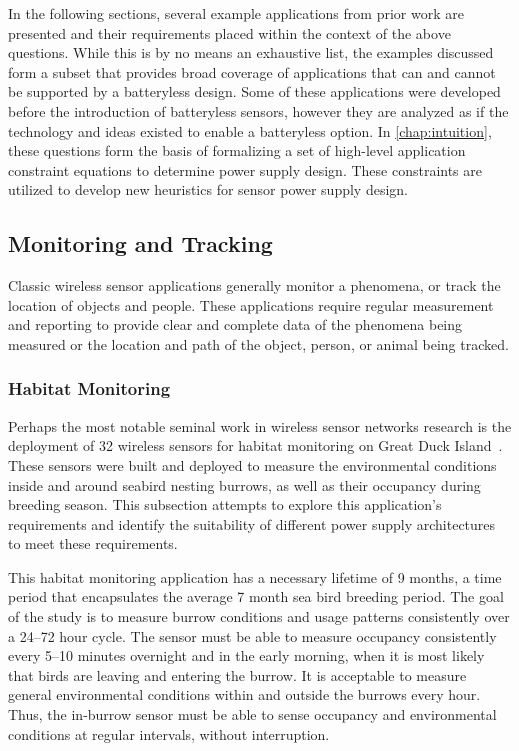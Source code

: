\noindent In the following sections, several example applications from prior work are presented and their requirements placed within the context of the above questions. While this is by no means an exhaustive list, the examples discussed form a subset that provides broad coverage of applications that can and cannot be supported by a batteryless design.
Some of these applications were developed before the introduction of batteryless sensors, however they are analyzed as if the technology and ideas existed to enable a batteryless option.
In \cref{chap:intuition}, these questions form the basis of formalizing a set of high-level application constraint equations to determine power supply design.
These constraints are utilized to develop new heuristics for sensor power supply design.

\subsection{Monitoring and Tracking}
Classic wireless sensor applications generally monitor a phenomena, or track the location of objects and people.
These applications require regular measurement and reporting to provide clear and complete data of the phenomena being measured or the location and path of the object, person, or animal being tracked.

\subsubsection{Habitat Monitoring}
Perhaps the most notable seminal work in wireless sensor networks research is the deployment of 32 wireless sensors for habitat monitoring on Great Duck Island~\cite{mainwaring2002wireless}.
These sensors were built and deployed to measure the environmental conditions inside and around seabird nesting burrows, as well as their occupancy during breeding season.
This subsection attempts to explore this application's requirements and identify the suitability of different power supply architectures to meet these requirements.

This habitat monitoring application has a necessary lifetime of 9 months, a time period that encapsulates the average 7 month sea bird breeding period.
The goal of the study is to measure burrow conditions and usage patterns consistently over a 24--72 hour cycle. The sensor must be able to measure occupancy consistently every 5--10 minutes overnight and in the early morning, when it is most likely that birds are leaving and entering the burrow.
It is acceptable to measure general environmental conditions within and outside the burrows every hour.
Thus, the in-burrow sensor must be able to sense occupancy and environmental conditions at regular intervals, without interruption.

